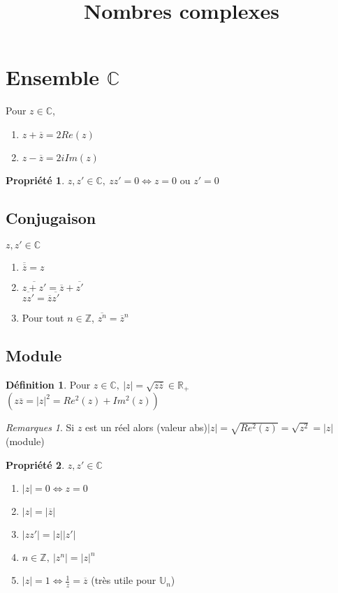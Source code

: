 \documentclass[fleqn]{article}
\title{Nombres complexes}
\date{}
\theoremstyle{definition} \newtheorem*{defi}{D\'efinition}
\theoremstyle{definition} \newtheorem*{theo}{Th\'eor\`eme}
\theoremstyle{definition} \newtheorem*{coro}{Corollaire}
\theoremstyle{remark} \newtheorem*{rqs}{Remarques}
\theoremstyle{definition} \newtheorem*{prop}{Propri\'et\'e}
\begin{document}
\maketitle

\section{Ensemble $\mathbb{C}$}
Pour $z \in \mathbb{C}$,
\begin{enumerate}
	\item $z + \overline{z} = 2Re(z)$
	\item $z - \overline{z} = 2iIm(z)$
\end{enumerate}

\begin{prop}
	$z,z' \in \mathbb{C},\ zz' = 0 \Leftrightarrow z = 0$ ou $z' = 0$
\end{prop}

\subsection{Conjugaison}
$z,z' \in \mathbb{C}$
\begin{enumerate}
	\item $\overline{\overline{z}} = z$
	\item $\overline{z + z'} = \overline{z} + \overline{z'}$\\
		$\overline{zz'} = \overline{z} \overline{z'}$
	\item Pour tout $n \in \mathbb{Z}$, $\overline{z^n} = \overline{z}^n$
\end{enumerate}

\subsection{Module}
\begin{defi}
	Pour $z \in \mathbb{C},\ |z| = \sqrt{z\overline{z}} \in \mathbb{R}_+$ \\
	$(z\overline{z} = |z|^2 = Re^2(z) + Im^2(z))$
	\begin{rqs}
		Si $z$ est un r\'eel alors (valeur abs)$|z| = \sqrt{Re^2(z)} = \sqrt{z^2} = |z|$(module)
	\end{rqs}
\end{defi}

\begin{prop} $z,z' \in \mathbb{C}$
	\begin{enumerate}
		\item $|z| = 0 \Leftrightarrow z = 0$
		\item $|z| = |\overline{z}|$
		\item $|zz'| = |z||z'|$
		\item $n \in \mathbb{Z},\ |z^n| = |z|^n$
		\item $|z| = 1 \Leftrightarrow \frac{1}{z} = \overline{z}$ (tr\`es utile pour $\mathbb{U}_n$)
	\end{enumerate}
\end{prop}
\end{document}

